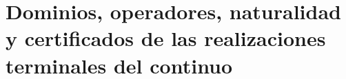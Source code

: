 \HMTFlushCurrentChapter
\chapter{Dominios, operadores, naturalidad y certificados de las realizaciones terminales del continuo}
\begingroup
\renewcommand{\chapter}[2][]{}%

\endgroup











\HMTFlushCurrentChapter
